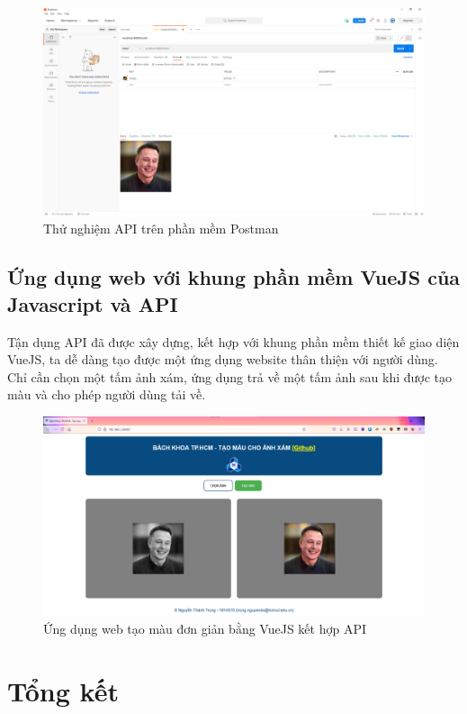 \documentclass[a4paper, 12pt]{article}
\begin{document}
\begin{figure}[!h]
\centering
\includegraphics[width=15cm]{images/postman.png}
\caption{Thử nghiệm API trên phần mềm Postman}
\end{figure}

\subsection{Ứng dụng web với khung phần mềm VueJS của Javascript và API}
Tận dụng API đã được xây dựng, kết hợp với khung phần mềm thiết kế giao diện VueJS, ta dễ dàng tạo được một ứng dụng website thân thiện với người dùng. Chỉ cần chọn một tấm ảnh xám, ứng dụng trả về một tấm ảnh sau khi được tạo màu và cho phép người dùng tải về.

\begin{figure}[!h]
\centering
\includegraphics[width=15cm]{images/demoweb.png}
\caption{Ứng dụng web tạo màu đơn giản bằng VueJS kết hợp API}
\end{figure}


\section{Tổng kết}
\end{document}
